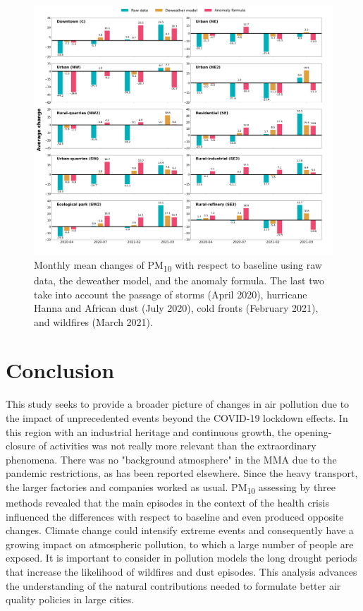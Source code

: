 \documentclass[preprint,12pt]{elsarticle}
\begin{document}
\begin{figure}[ht!]
	\centering
	\includegraphics[width=\linewidth]{figures/average_change_deweather_fourier.png}
	\caption{Monthly mean changes of PM\textsubscript{10} with respect to baseline using raw data, the deweather model, and the anomaly formula. The last two take into account the passage of storms (April 2020), hurricane Hanna and African dust (July 2020), cold fronts (February 2021), and wildfires (March 2021).
	}
	\label{fig:average_change_deweather_fourier}
\end{figure}
\section{Conclusion}
This study seeks to provide a broader picture of changes in air pollution due to the impact of unprecedented events beyond the COVID-19 lockdown effects. In this region with an industrial heritage and continuous growth, the opening-closure of activities was not really more relevant than the extraordinary phenomena. There was no "background atmosphere" in the MMA due to the pandemic restrictions, as has been reported elsewhere. Since the heavy transport, the larger factories and companies worked as usual. PM\textsubscript{10} assessing by three methods revealed that the main episodes in the context of the health crisis influenced the differences with respect to baseline and even produced opposite changes. Climate change could intensify extreme events and consequently have a growing impact on atmospheric pollution, to which a large number of people are exposed. It is important to consider in pollution models the long drought periods that increase the likelihood of wildfires and dust episodes. This analysis advances the understanding of the natural contributions needed to formulate better air quality policies in large cities.
\end{document}
